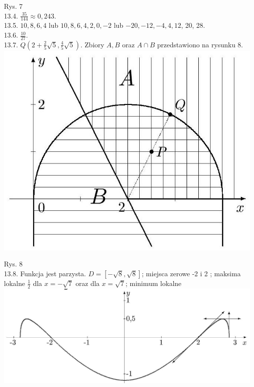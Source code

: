 \documentclass[10pt]{article}
\begin{document}
Rys. 7\\
13.4. $\frac{35}{144} \approx 0,243$.\\
13.5. $10,8,6,4$ lub $10,8,6,4,2,0,-2$ lub $-20,-12,-4,4,12$, 20, 28.\\
13.6. $\frac{10}{27}$.\\
13.7. $Q\left(2+\frac{2}{5} \sqrt{5}, \frac{4}{5} \sqrt{5}\right)$. Zbiory $A, B$ oraz $A \cap B$ przedstawiono na rysunku 8.\\
\includegraphics[max width=\textwidth, center]{2024_11_16_fe5b564401bf7db98894g-062}

Rys. 8\\
13.8. Funkcja jest parzysta. $D=[-\sqrt{8}, \sqrt{8}]$; miejsca zerowe -2 i 2 ; maksima lokalne $\frac{1}{2}$ dla $x=-\sqrt{7}$ oraz dla $x=\sqrt{7}$; minimum lokalne\\
\includegraphics[max width=\textwidth, center]{2024_11_16_fe5b564401bf7db98894g-062(1)}
\end{document}

